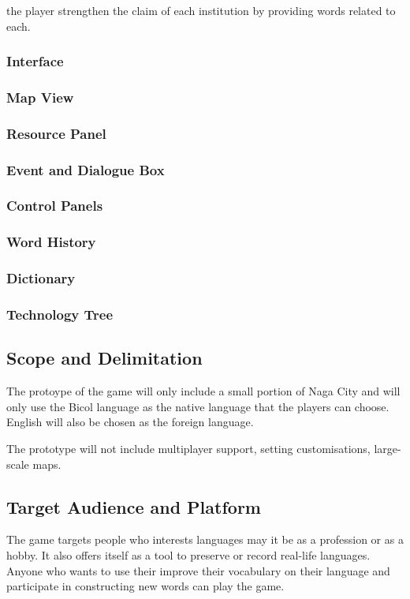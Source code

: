 \documentclass[11pt]{article}
\begin{document}
the player strengthen the claim of each institution by providing words related to each.

\subsubsection{Interface}
\subsubsection{Map View}
\subsubsection{Resource Panel}
\subsubsection{Event and Dialogue Box}
\subsubsection{Control Panels}
\subsubsection{Word History}
\subsubsection{Dictionary}
\subsubsection{Technology Tree}



\subsection{Scope and Delimitation}
The protoype of the game will only include a small portion of Naga City and will only use the Bicol language as the native language that the players can choose. English will also be chosen as the foreign language.

The prototype will not include multiplayer support, setting customisations, large-scale maps.



\subsection{Target Audience and Platform}
The game targets people who interests languages may it be as a profession or as a hobby. It also offers itself as a tool to preserve or record real-life languages. Anyone who wants to use their improve their vocabulary on their language and participate in constructing new words can play the game.
\end{document}
